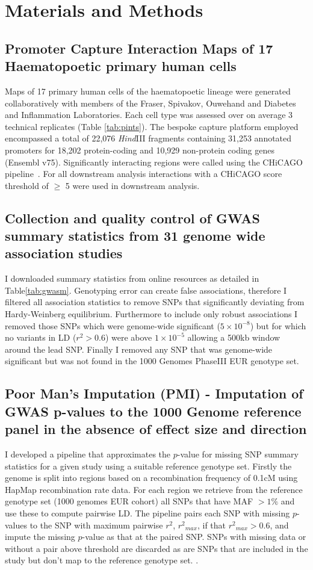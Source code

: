 \documentclass[a4paper,11pt]{report}
\begin{document}
\chapter{Materials and Methods}

\section{Promoter Capture Interaction Maps of 17 Haematopoetic primary human cells}
Maps of 17 primary human cells of the haematopoetic lineage were generated collaboratively with members of the Fraser, Spivakov, Ouwehand and Diabetes and Inflammation Laboratories. Each cell type was assessed over on average 3 technical replicates (Table \ref{tab:pints}). The bespoke capture platform employed encompassed a total of 22,076 \textit{Hind}III fragments containing 31,253 annotated promoters for 18,202 protein-coding and 10,929 non-protein coding genes (Ensembl v75). Significantly interacting regions were called using the CHiCAGO pipeline~\citep{CairnsFreire-PritchettWingettEtAl2016}. For all downstream analysis interactions with a CHiCAGO score threshold of $\geqslant$ 5 were used in downstream analysis.

\section{Collection and quality control of GWAS summary statistics from 31 genome wide association studies}
I downloaded summary statistics from online resources as detailed in Table\ref{tab:gwasm}. Genotyping error can create false associations,  therefore I filtered all association statistics to remove SNPs that significantly deviating from Hardy-Weinberg equilibrium. Furthermore to include only robust associations I removed those SNPs which were genome-wide significant ($5 \times 10^{-8}$) but for which no variants in LD ($r^{2} > 0.6$) were  above $1 \times 10^{-5}$ allowing a 500kb window around the lead SNP. Finally I removed any SNP that was genome-wide significant but was not found in the 1000 Genomes PhaseIII EUR genotype set. 
\section{Poor Man's Imputation (PMI) - Imputation of GWAS p-values to the 1000 Genome reference panel in the absence of effect size and direction}
I developed a pipeline that approximates the $p$-value for missing SNP summary statistics for a given study using a suitable reference genotype set. Firstly the genome is split into regions based on a recombination frequency of 0.1cM using HapMap recombination rate data. For each region we retrieve from the reference genotype set (1000 genomes EUR cohort) all SNPs that have MAF $ > 1\%$ and use these to compute pairwise LD. The pipeline pairs each SNP with missing $p$-values to the SNP with maximum pairwise $r^2$, ${r^2}_{max}$, if that ${r^2}_{max} > 0.6$, and impute the missing $p$-value as that at the paired SNP. SNPs with missing data or without a pair above threshold are discarded as are SNPs that are included in the study but don’t map to the reference genotype set. . 
\end{document}
